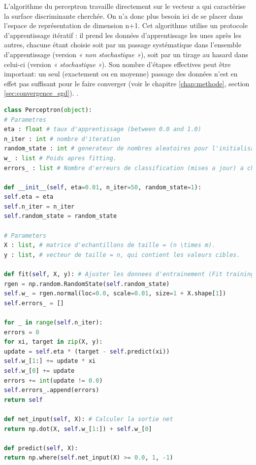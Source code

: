 L'algorithme du perceptron travaille directement sur le vecteur a qui caractérise la surface discriminante cherchée. On n'a donc plus besoin ici de se placer dans l'espace de représentation de dimension n+1. Cet algorithme utilise un protocole d'apprentissage itératif : il prend les données d'apprentissage les unes après les autres, chacune étant choisie soit par un passage systématique dans l'ensemble d'apprentissage (version \textit{« non stochastique »}), soit par un tirage au hasard dans celui-ci (version\textit{ « stochastique »}). Son nombre d'étapes effectives peut être important: un seul (exactement ou en moyenne) passage des données n'est en effet pas suffisant pour le faire converger (voir le chapitre \ref{chap:methode}, section \ref{sec:convergence_sgd}). \cite{antoine2018apprentissage}.



\begin{lstlisting}[language=python]
class Perceptron(object):
# Parametres
eta : float # taux d'apprentissage (between 0.0 and 1.0)
n_iter : int # nombre d'iteration
random_state : int # generateur de nombres aleatoires pour l'initialisation de poids aleatoire.
w_ : list # Poids apres fitting.
errors_ : list # Nombre d'erreurs de classification (mises a jour) a chaque epoque.

def __init__(self, eta=0.01, n_iter=50, random_state=1):
self.eta = eta
self.n_iter = n_iter
self.random_state = random_state

# Parameters
X : list, # matrice d'echantillons de taille = (n \times m).
y : list, # vecteur de taille = n, qui contient les valeurs cibles.

def fit(self, X, y): # Ajuster les donnees d'entrainement (Fit training data).
rgen = np.random.RandomState(self.random_state)
self.w_ = rgen.normal(loc=0.0, scale=0.01, size=1 + X.shape[1])
self.errors_ = []

for _ in range(self.n_iter):
errors = 0
for xi, target in zip(X, y):
update = self.eta * (target - self.predict(xi))
self.w_[1:] += update * xi
self.w_[0] += update
errors += int(update != 0.0)
self.errors_.append(errors)
return self

def net_input(self, X): # Calculer la sortie net
return np.dot(X, self.w_[1:]) + self.w_[0]

def predict(self, X):
return np.where(self.net_input(X) >= 0.0, 1, -1)
\end{lstlisting}





